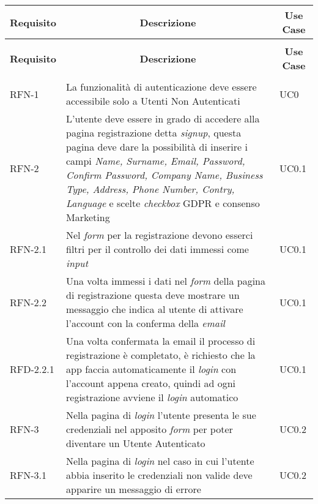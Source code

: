 \begin{center}
    \begin{longtable}{|p{2.25cm}|p{7.75cm}|p{2.25cm}|}
    \hline
    \multicolumn{1}{|c|}{\textbf{Requisito}} & \multicolumn{1}{c|}{\textbf{Descrizione}} & \multicolumn{1}{c|}{\textbf{Use Case}}\\
    \hline 
    \endfirsthead
    \rowcolor{white}
    \multicolumn{3}{c}{{\bfseries \tablename\ \thetable{} -- Continuo della tabella}}\\
    \hline
    \multicolumn{1}{|c|}{\textbf{Requisito}} & \multicolumn{1}{c|}{\textbf{Descrizione}} & \multicolumn{1}{c|}{\textbf{Use Case}}\\
    \hline 
    \endhead
    \hline
    \rowcolor{white}
    \multicolumn{3}{|r|}{{Continua nella prossima pagina...}}\\
    \hline
    \endfoot
    \endlastfoot
    RFN-1 & La funzionalità di autenticazione deve essere accessibile solo a Utenti Non Autenticati & UC0 \\
    \hline
    RFN-2 & L'utente deve essere in grado di accedere alla pagina registrazione detta \textit{signup}, questa pagina deve dare la possibilità di inserire i campi \textit{Name, Surname, Email, Password, Confirm Password, Company Name, Business Type, Address, Phone Number, Contry, Language} e scelte \textit{checkbox} GDPR e consenso Marketing & UC0.1 \\
    \hline
    RFN-2.1 & Nel \textit{form} per la registrazione devono esserci filtri per il controllo dei dati immessi come \textit{input} & UC0.1 \\
    \hline
    RFN-2.2 & Una volta immessi i dati nel \textit{form} della pagina di registrazione questa deve mostrare un messaggio che indica al utente di attivare l'account con la conferma della \textit{email} & UC0.1 \\
    \hline
    RFD-2.2.1 & Una volta confermata la email il processo di registrazione è completato, è richiesto che la app faccia automaticamente il \textit{login} con l'account appena creato, quindi ad ogni registrazione avviene il \textit{login} automatico & UC0.1 \\
    \hline
    RFN-3 & Nella pagina di \textit{login} l'utente presenta le sue credenziali nel apposito \textit{form} per poter diventare un Utente Autenticato & UC0.2 \\
    \hline
    RFN-3.1 & Nella pagina di \textit{login} nel caso in cui l'utente abbia inserito le credenziali non valide deve apparire un messaggio di errore & UC0.2 \\

\end{longtable}
\end{center}
